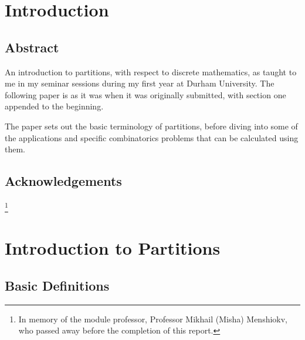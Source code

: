 \section{Introduction}

\subsection*{Abstract}

An introduction to partitions, with respect to discrete mathematics, as taught to me in my seminar sessions during my first year at Durham University. The following paper is as it was when it was originally submitted, with section one appended to the beginning. 

The paper sets out the basic terminology of partitions, before diving into some of the applications and specific combinatorics problems that can be calculated using them. 

\subsection*{Acknowledgements}

\thanks{In memory of the module professor, Professor Mikhail (Misha) Menshiokv, who passed away before the completion of this report.}

\section{Introduction to Partitions}

\subsection{Basic Definitions}






